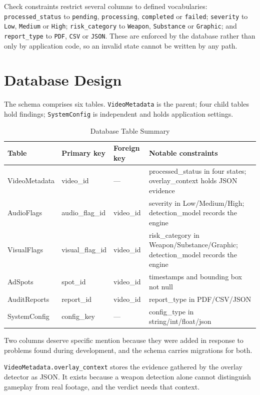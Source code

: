 \documentclass[
12pt,
a4paper,
oneside
]{report}
\begin{document}
Check constraints restrict several columns to defined vocabularies:
\texttt{processed\_status} to \texttt{pending}, \texttt{processing},
\texttt{completed} or \texttt{failed}; \texttt{severity} to \texttt{Low},
\texttt{Medium} or \texttt{High}; \texttt{risk\_category} to \texttt{Weapon},
\texttt{Substance} or \texttt{Graphic}; and \texttt{report\_type} to
\texttt{PDF}, \texttt{CSV} or \texttt{JSON}. These are enforced by the database
rather than only by application code, so an invalid state cannot be written by
any path.

\section{Database Design}

The schema comprises six tables. \texttt{VideoMetadata} is the parent; four
child tables hold findings; \texttt{SystemConfig} is independent and holds
application settings.

\begin{table}[H]
\centering
\small
\begin{tabular}{|p{3.2cm}|p{3.2cm}|p{2.2cm}|p{4cm}|}
\hline
\textbf{Table} & \textbf{Primary key} & \textbf{Foreign key} &
\textbf{Notable constraints} \\
\hline
VideoMetadata & video\_id & --- & processed\_status in four states;
overlay\_context holds JSON evidence \\
\hline
AudioFlags & audio\_flag\_id & video\_id & severity in Low/Medium/High;
detection\_model records the engine \\
\hline
VisualFlags & visual\_flag\_id & video\_id & risk\_category in
Weapon/Substance/Graphic; detection\_model records the engine \\
\hline
AdSpots & spot\_id & video\_id & timestamps and bounding box not null \\
\hline
AuditReports & report\_id & video\_id & report\_type in PDF/CSV/JSON \\
\hline
SystemConfig & config\_key & --- & config\_type in string/int/float/json \\
\hline
\end{tabular}
\caption{Database Table Summary}
\end{table}

Two columns deserve specific mention because they were added in response to
problems found during development, and the schema carries migrations for both.

\texttt{VideoMetadata.overlay\_context} stores the evidence gathered by the
overlay detector as JSON. It exists because a weapon detection alone cannot
distinguish gameplay from real footage, and the verdict needs that context.
\end{document}
